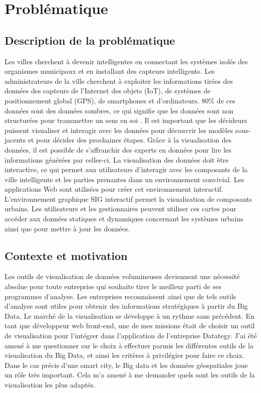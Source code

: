 \documentclass[french, a4paper, 12pt]{report}
\begin{document}
\chapter{Problématique}
\section{Description de la problématique}
Les villes cherchent à devenir intelligentes en connectant les systèmes isolés des organismes municipaux et en installant des capteurs intelligents. Les administrateurs de la ville cherchent à exploiter les informations tirées des données des capteurs de l'Internet des objets (IoT), de systèmes de positionnement global (GPS), de smartphones et d'ordinateurs. 80\% de ces données sont des données sombres, ce qui signifie que les données sont non structurées pour transmettre un sens en soi \cite{10}.
Il est important que les décideurs puissent visualiser et interagir avec les données pour découvrir les modèles sous-jacents et pour décider des prochaines étapes. Grâce à la visualisation des données, il est possible de s’affranchir des experts en données pour lire les informations générées par celles-ci. 
La visualisation des données doit être interactive, ce qui permet aux utilisateurs d’interagir avec les composants de la ville intelligente et les parties prenantes dans un environnement convivial. Les applications Web sont utilisées pour créer cet environnement interactif. L'environnement graphique SIG interactif permet la visualisation de composants urbains. Les utilisateurs et les gestionnaires peuvent utiliser ces cartes pour accéder aux données statiques et dynamiques concernant les systèmes urbains ainsi que pour mettre à jour les données.

\section{Contexte et motivation}
Les outils de visualisation de données volumineuses deviennent une nécessité absolue pour toute entreprise qui souhaite tirer le meilleur parti de ses programmes d’analyse. Les entreprises reconnaissent ainsi que de tels outils d’analyse sont utiles pour obtenir des informations stratégiques à partir du Big Data. Le marché de la visualisation se développe à un rythme sans précédent. En tant que développeur web front-end, une de mes missions était de choisir un outil de visualisation pour l'intégrer dans l’application de l’entreprise Datategy. J’ai été amené à me questionner sur le choix à effectuer parmis les différentes outils de la visualisation du Big Data, et ainsi les critères à privilégier pour faire ce choix. Dans le cas précis d’une smart city, le Big data et les données géospatiales joue un rôle très important. Cela m’a amené à me demander quels sont les outils de la visualisation les plus adaptés. 
\end{document}
